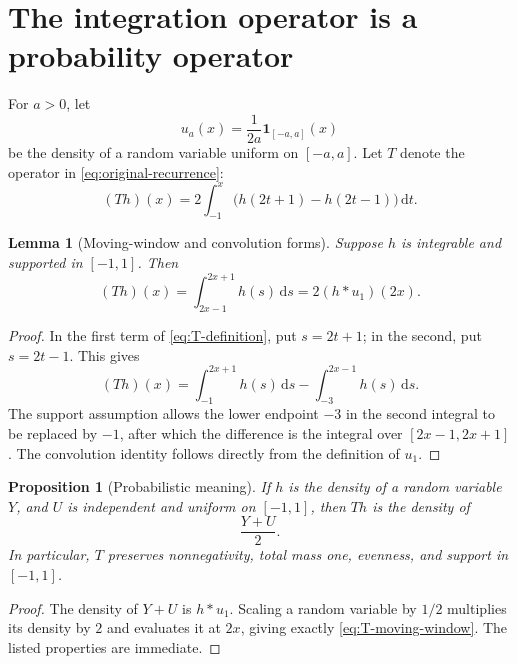 \documentclass[11pt,oneside]{article}
\newtheorem{proposition}[theorem]{Proposition}
\newtheorem{lemma}[theorem]{Lemma}
\theoremstyle{definition}
\theoremstyle{remark}
\newcommand{\conv}{*}
\newcommand{\ind}{\mathbf 1}
\newcommand{\dd}{\,\mathrm d}
\begin{document}
\section{The integration operator is a probability operator}
\label{sec:probability-operator}

For $a>0$, let
\begin{equation}
 u_a(x)=\frac1{2a}\ind_{[-a,a]}(x)
 \label{eq:uniform-density}
\end{equation}
be the density of a random variable uniform on $[-a,a]$.  Let $T$ denote the operator in
\eqref{eq:original-recurrence}:
\begin{equation}
 (Th)(x)=2\int_{-1}^{x}\bigl(h(2t+1)-h(2t-1)\bigr)\dd t.
 \label{eq:T-definition}
\end{equation}

\begin{lemma}[Moving-window and convolution forms]
\label{lem:T-convolution}
Suppose $h$ is integrable and supported in $[-1,1]$.  Then
\begin{equation}
 (Th)(x)=\int_{2x-1}^{2x+1}h(s)\dd s
 =2(h\conv u_1)(2x).
 \label{eq:T-moving-window}
\end{equation}
\end{lemma}

\begin{proof}
In the first term of \eqref{eq:T-definition}, put $s=2t+1$; in the second, put
$s=2t-1$.  This gives
\[
 (Th)(x)=\int_{-1}^{2x+1}h(s)\dd s-\int_{-3}^{2x-1}h(s)\dd s.
\]
The support assumption allows the lower endpoint $-3$ in the second integral to be
replaced by $-1$, after which the difference is the integral over $[2x-1,2x+1]$.
The convolution identity follows directly from the definition of $u_1$.
\end{proof}

\begin{proposition}[Probabilistic meaning]
\label{prop:T-probability}
If $h$ is the density of a random variable $Y$, and $U$ is independent and uniform on
$[-1,1]$, then $Th$ is the density of
\begin{equation}
 \frac{Y+U}{2}.
 \label{eq:T-random-map}
\end{equation}
In particular, $T$ preserves nonnegativity, total mass one, evenness, and support in
$[-1,1]$.
\end{proposition}

\begin{proof}
The density of $Y+U$ is $h\conv u_1$.  Scaling a random variable by $1/2$ multiplies its
density by $2$ and evaluates it at $2x$, giving exactly \eqref{eq:T-moving-window}.
The listed properties are immediate.
\end{proof}
\end{document}

